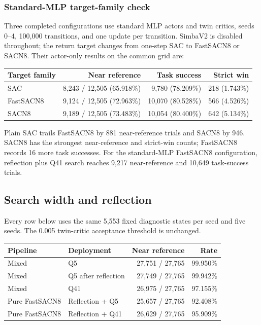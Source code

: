 \subsubsection{Standard-MLP target-family check}

Three completed configurations use standard MLP actors and twin critics, seeds 0--4, 100,000 transitions, and one update per transition. SimbaV2 is disabled throughout; the return target changes from one-step SAC to FastSACN8 or SACN8. Their actor-only results on the common grid are:

\begin{center}
\begin{tabular}{lrrr}
\toprule
Target family & Near reference & Task success & Strict win\\
\midrule
SAC & 8,243 / 12,505 (65.918\%) & 9,780 (78.209\%) & 218 (1.743\%)\\
FastSACN8 & 9,124 / 12,505 (72.963\%) & 10,070 (80.528\%) & 566 (4.526\%)\\
SACN8 & 9,189 / 12,505 (73.483\%) & 10,054 (80.400\%) & 642 (5.134\%)\\
\bottomrule
\end{tabular}
\end{center}

Plain SAC trails FastSACN8 by 881 near-reference trials and SACN8 by 946. SACN8 has the strongest near-reference and strict-win counts; FastSACN8 records 16 more task successes. For the standard-MLP FastSACN8 configuration, reflection plus Q41 search reaches 9,217 near-reference and 10,649 task-success trials.

\clearpage
\subsection{Search width and reflection}

Every row below uses the same 5,553 fixed diagnostic states per seed and five seeds. The 0.005 twin-critic acceptance threshold is unchanged.

\begin{center}
\begin{tabular}{llrr}
\toprule
Pipeline & Deployment & Near reference & Rate\\
\midrule
Mixed & Q5 & 27,751 / 27,765 & 99.950\%\\
Mixed & Q5 after reflection & 27,749 / 27,765 & 99.942\%\\
Mixed & Q41 & 26,975 / 27,765 & 97.155\%\\
Pure FastSACN8 & Reflection + Q5 & 25,657 / 27,765 & 92.408\%\\
Pure FastSACN8 & Reflection + Q41 & 26,629 / 27,765 & 95.909\%\\
\bottomrule
\end{tabular}
\end{center}

